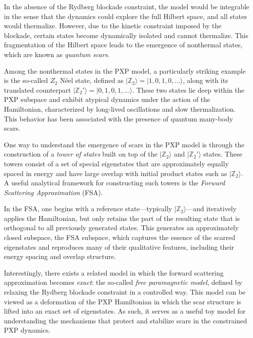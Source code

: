 \documentclass{article}
\begin{document}
In the absence of the Rydberg blockade constraint, the model would be integrable in the sense that the dynamics could explore the full Hilbert space, and all states would thermalize. However, due to the kinetic constraint imposed by the blockade, certain states become dynamically isolated and cannot thermalize. This fragmentation of the Hilbert space leads to the emergence of nonthermal states, which are known as \emph{quantum scars}.

Among the nonthermal states in the PXP model, a particularly striking example is the so-called $Z_2$ Néel state, defined as \( |\mathbb{Z}_2\rangle = |1,0,1,0,\dots\rangle \), along with its translated counterpart \( |\mathbb{Z}_2'\rangle = |0,1,0,1,\dots\rangle \). These two states lie deep within the PXP subspace and exhibit atypical dynamics under the action of the Hamiltonian, characterized by long-lived oscillations and slow thermalization. This behavior has been associated with the presence of quantum many-body scars.

One way to understand the emergence of scars in the PXP model is through the construction of a \emph{tower of states} built on top of the $|\mathbb{Z}_2\rangle$ and $|\mathbb{Z}_2'\rangle$ states. These towers consist of a set of special eigenstates that are approximately equally spaced in energy and have large overlap with initial product states such as $|\mathbb{Z}_2\rangle$. A useful analytical framework for constructing such towers is the \emph{Forward Scattering Approximation} (FSA).

In the FSA, one begins with a reference state—typically $|\mathbb{Z}_2\rangle$—and iteratively applies the Hamiltonian, but only retains the part of the resulting state that is orthogonal to all previously generated states. This generates an approximately closed subspace, the FSA subspace, which captures the essence of the scarred eigenstates and reproduces many of their qualitative features, including their energy spacing and overlap structure.

Interestingly, there exists a related model in which the forward scattering approximation becomes \emph{exact}: the so-called \emph{free paramagnetic model}, defined by relaxing the Rydberg blockade constraint in a controlled way. This model can be viewed as a deformation of the PXP Hamiltonian in which the scar structure is lifted into an exact set of eigenstates. As such, it serves as a useful toy model for understanding the mechanisms that protect and stabilize scars in the constrained PXP dynamics.\\
\end{document}
